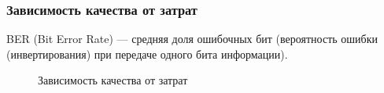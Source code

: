 \begin{frame}
    \frametitle{Зависимость качества от затрат}
    
    \begin{definition}
        BER (Bit Error Rate) --- средняя доля ошибочных бит (вероятность ошибки (инвертирования) при передаче одного бита информации).
    \end{definition}
    
    \begin{figure}
        \begin{center}
            \caption{Зависимость качества от затрат}\label{pict:money2ber}
        \end{center}
    \end{figure} 
    
\end{frame}


